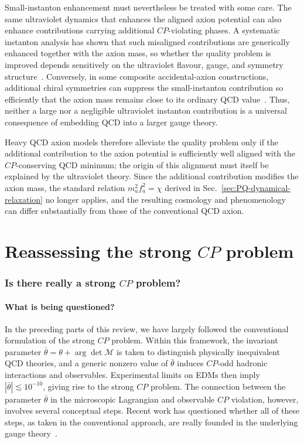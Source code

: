 \documentclass[review]{elsarticle}
\numberwithin{equation}{section}
\numberwithin{table}{section}
\numberwithin{figure}{section}
\def\M{\mathcal{M}}
\begin{document}
Small-instanton enhancement must nevertheless be treated with some care. The same ultraviolet dynamics that enhances the aligned axion potential can also enhance contributions carrying additional $CP$-violating phases. A systematic instanton analysis has shown that such misaligned contributions are generically enhanced together with the axion mass, so whether the quality problem is improved depends sensitively on the ultraviolet flavour, gauge, and symmetry structure~\cite{Csaki:2023ziz}. Conversely, in some composite accidental-axion constructions, additional chiral symmetries can suppress the small-instanton contribution so efficiently that the axion mass remains close to its ordinary QCD value~\cite{Aoki:2024usv}. Thus, neither a large nor a negligible ultraviolet instanton contribution is a universal consequence of embedding QCD into a larger gauge theory.

Heavy QCD axion models therefore alleviate the quality problem only if the additional contribution to the axion potential is sufficiently well aligned with the $CP$-conserving QCD minimum; the origin of this alignment must itself be explained by the ultraviolet theory. Since the additional contribution modifies the axion mass, the standard relation $m_a^2f_a^2=\chi$ derived in Sec.~\ref{sec:PQ-dynamical-relaxation} no longer applies, and the resulting cosmology and phenomenology can differ substantially from those of the conventional QCD axion.

\part{Reassessing the strong \texorpdfstring{$CP$}{CP} problem}

\label{part:reassessment}

\section{Is there really a strong \texorpdfstring{$CP$}{CP} problem?}
\label{sec:reassessment}


\subsection{What is being questioned?}
\label{sec:reassessment-what-questioned}

In the preceding parts of this review, we have largely followed the conventional formulation of the strong $CP$ problem. Within this framework, the invariant parameter
$\bar\theta=\theta+\arg\det\M$ is taken to distinguish physically inequivalent QCD theories, and a generic nonzero value of $\bar\theta$ induces $CP$-odd hadronic interactions and observables. Experimental limits on EDMs then imply $|\bar\theta|\lesssim10^{-10}$, giving rise to the strong $CP$ problem. The connection between the parameter $\bar\theta$ in the microscopic Lagrangian and observable $CP$ violation, however, involves several conceptual steps. Recent work has questioned whether all of these steps, as taken in the conventional approach, are really founded in the underlying gauge theory~\cite{Ai:2020ptm,Ai:2024vfa,Ai:2024cnp}.
\end{document}
